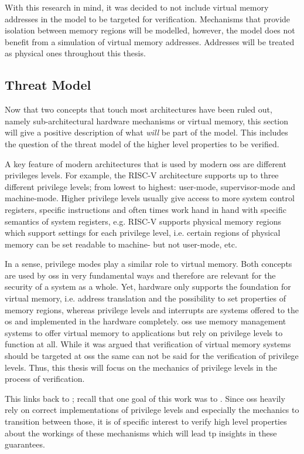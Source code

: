 With this research in mind, it was decided to not include virtual memory addresses in the model to be targeted for verification.
Mechanisms that provide isolation between memory regions will be modelled, however, the model does not benefit from a simulation of virtual memory addresses.
Addresses will be treated as physical ones throughout this thesis.

\subsection{Threat Model}
\label{sec:threat-model}

Now that two concepts that touch most architectures have been ruled out, namely sub-architectural hardware mechanisms or virtual memory, this section will give a positive description of what \textit{will} be part of the model.
This includes the question of the threat model of the higher level properties to be verified.

A key feature of modern architectures that is used by modern \glspl{os} are different privileges levels.
For example, the RISC-V architecture supports up to three different privilege levels; from lowest to highest: user-mode, supervisor-mode and machine-mode.
Higher privilege levels usually give access to more system control registers, specific instructions and often times work hand in hand with specific semantics of system registers, e.g. RISC-V supports physical memory regions which support settings for each privilege level, i.e. certain regions of physical memory can be set readable to machine- but not user-mode, etc.

In a sense, privilege modes play a similar role to virtual memory.
Both concepts are used by \glspl{os} in very fundamental ways and therefore are relevant for the security of a system as a whole.
Yet, hardware only supports the foundation for virtual memory, i.e. address translation and the possibility to set properties of memory regions, whereas privilege levels and interrupts are systems offered to the \gls{os} and implemented in the hardware completely.
\glspl{os} use memory management systems to offer virtual memory to applications but rely on privilege levels to function at all.
While it was argued that verification of virtual memory systems should be targeted at \glspl{os} the same can not be said for the verification of privilege levels.
Thus, this thesis will focus on the mechanics of privilege levels in the process of verification.

This links back to \cite{Reid17}; recall that one goal of this work was to .
Since \glspl{os} heavily rely on correct implementations of privilege levels and especially the mechanics to transition between those, it is of specific interest to verify high level properties about the workings of these mechanisms which will lead tp insights in these guarantees.


